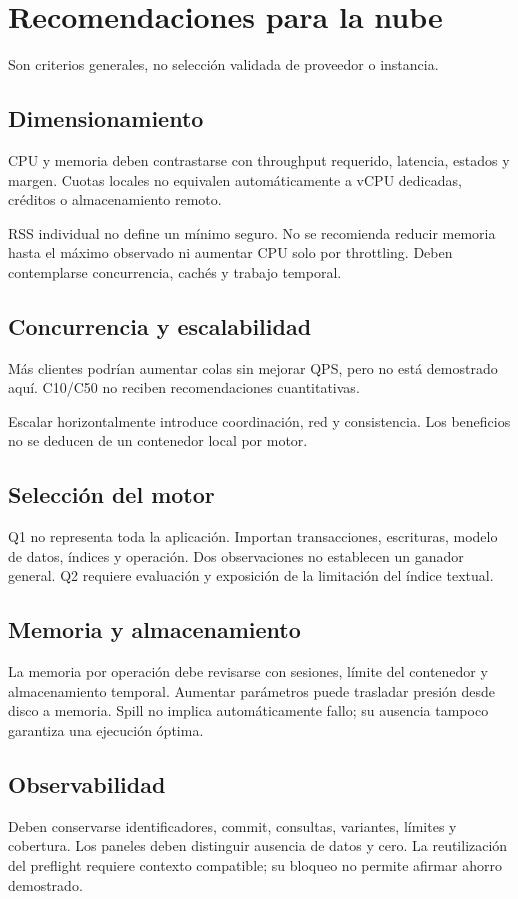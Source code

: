 \section{Recomendaciones para la nube}
Son criterios generales, no selección validada de proveedor o instancia.
\subsection{Dimensionamiento}
CPU y memoria deben contrastarse con throughput requerido, latencia,
estados y margen. Cuotas locales no equivalen automáticamente a vCPU
dedicadas, créditos o almacenamiento remoto.

RSS individual no define un mínimo seguro. No se recomienda reducir
memoria hasta el máximo observado ni aumentar CPU solo por throttling.
Deben contemplarse concurrencia, cachés y trabajo temporal.

\subsection{Concurrencia y escalabilidad}
Más clientes podrían aumentar colas sin mejorar QPS, pero no está
demostrado aquí. C10/C50 no reciben recomendaciones cuantitativas.

Escalar horizontalmente introduce coordinación, red y consistencia.
Los beneficios no se deducen de un contenedor local por motor.

\subsection{Selección del motor}
Q1 no representa toda la aplicación. Importan transacciones, escrituras,
modelo de datos, índices y operación. Dos observaciones no establecen
un ganador general. Q2 requiere evaluación y exposición de la limitación
del índice textual.

\subsection{Memoria y almacenamiento}
La memoria por operación debe revisarse con sesiones, límite del
contenedor y almacenamiento temporal. Aumentar parámetros puede trasladar
presión desde disco a memoria. Spill no implica automáticamente fallo;
su ausencia tampoco garantiza una ejecución óptima.

\subsection{Observabilidad}
Deben conservarse identificadores, commit, consultas, variantes, límites
y cobertura. Los paneles deben distinguir ausencia de datos y cero.
La reutilización del preflight requiere contexto compatible; su bloqueo
no permite afirmar ahorro demostrado.
